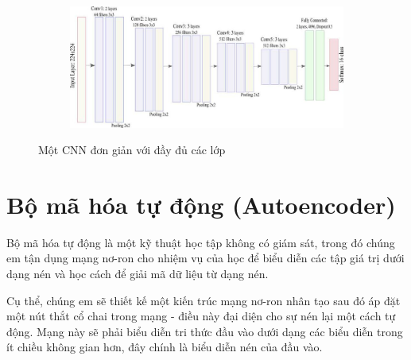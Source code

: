 \begin{figure}
    \begin{subfigure}{1.\textwidth}
        \begin{center}
            \includegraphics[width=1.\linewidth]{Chapters/items/chap2_8.jpg}
        \end{center}
        \label{fig: chap2_8}
    \end{subfigure}
    \caption{Một CNN đơn giản với đầy đủ các lớp}
\end{figure}

\newpage



\section{Bộ mã hóa tự động (Autoencoder)}

Bộ mã hóa tự động là một kỹ thuật học tập không có giám sát,
trong đó chúng em tận dụng mạng nơ-ron cho nhiệm vụ của học để biểu diễn các tập
giá trị dưới dạng nén và học cách để giải mã dữ liệu từ dạng nén.

Cụ thể, chúng em sẽ thiết kế một kiến trúc mạng nơ-ron nhân tạo sau đó áp đặt một
nút thắt cổ chai trong mạng - điều này đại diện cho sự nén lại một cách tự động.
Mạng này sẽ phải biểu diễn tri thức đầu vào dưới dạng các biểu diễn trong ít
chiều không gian hơn, đây chính là biểu diễn nén của đầu vào.

